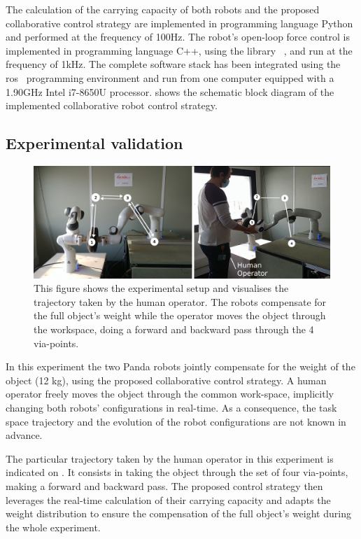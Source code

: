 The calculation of the carrying capacity of both robots and the proposed collaborative control strategy are implemented in programming language Python and performed at the frequency of 100Hz.  The robot's open-loop force control is implemented in programming language C++, using the library ~\cite{pinocchio2021}, and run at the frequency of 1kHz. The complete software stack has been integrated using the \gls{ros}~\cite{ros} programming environment and run from one computer equipped with a 1.90GHz Intel i7-8650U processor. 
 shows the schematic block diagram of the implemented collaborative robot control strategy. 

\subsection{Experimental validation}
\label{sec:experiment_dual_robto_carrying}
\begin{figure}[!h]
    \centering
    \includegraphics[width=\linewidth]{Papers/images/exp1_explication.jpg}
    \caption{This figure shows the experimental setup and visualises the trajectory taken by the human operator. The robots compensate for the full object's weight while the operator moves the object through the workspace, doing a forward and backward pass through the 4 via-points.}
    \label{fig:experiment1}
\end{figure}

In this experiment the two Panda robots jointly compensate for the weight of the object (12 kg), using the proposed collaborative control strategy. A human operator freely moves the object through the common work-space, implicitly changing both robots' configurations in real-time. As a consequence, the task space trajectory and the evolution of the robot configurations are not known in advance. 

The particular trajectory taken by the human operator in this experiment is indicated on . It consists in taking the object through the set of four via-points, making a forward and backward pass. The proposed control strategy then leverages the real-time calculation of their carrying capacity and adapts the weight distribution to ensure the compensation of the full object's weight during the whole experiment. 

